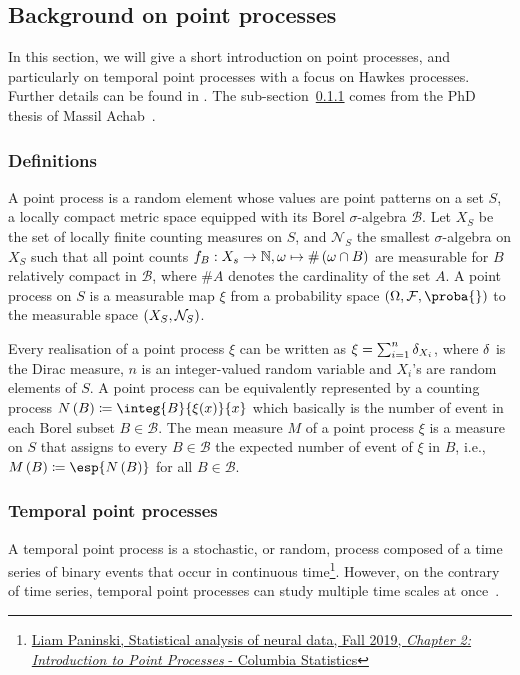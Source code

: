 \subsection{Background on point processes}\label{background_tpp}

In this section, we will give a short introduction on point processes, and particularly on temporal point processes with a focus on Hawkes processes.
Further details can be found in \citep{daley2003introduction, daley2007introduction}.
The sub-section~\ref{pp_definitions} comes from the PhD thesis of Massil Achab~\citep{achab2017learning}.

\subsubsection{Definitions}\label{pp_definitions}
A point process is a random element whose values are point patterns on a set $S$, a locally compact metric space equipped with its Borel $\sigma$-algebra $\mathscr{B}$.
Let $X_S$ be the set of locally finite counting measures on $S$, and $\mathcal{N}_S$ the smallest $\sigma$-algebra on $X_S$ such that all point counts ${f_B: X_s \to \mathbb{N}, \omega \mapsto \#\left( \omega \cap B \right)}$ are measurable for $B$ relatively compact in $\mathscr{B}$, where $\# A$ denotes the cardinality of the set $A$.
A point process on $S$ is a measurable map $\xi$ from a probability space $\pars{\Omega, \mathcal{F}, \proba{}}$ to the measurable space $\left( X_S, \mathcal{N}_S \right)$.

Every realisation of a point process $\xi$ can be written as $\xi = \sum_{i=1}^n \mathrm{\delta}_{X_i}$, where $\mathrm{\delta}$ is the Dirac measure, $n$ is an integer-valued random variable and $X_i$'s are random elements of $S$.
A point process can be equivalently represented by a counting process $N\pars{B} \coloneqq \integ{B}{\xi (x)}{x}$ which basically is the number of event in each Borel subset $B\in\mathscr{B}$.
The mean measure $M$ of a point process $\xi$ is a measure on $S$ that assigns to every $B\in\mathscr{B}$ the expected number of event of $\xi$ in $B$, i.e., $M\pars{B} \coloneqq \esp{N\pars{B}}$ for all $B\in\mathscr{B}$.


\subsubsection{Temporal point processes}
A temporal point process is a stochastic, or random, process composed of a time series of binary events that occur in continuous time\footnote{\href{http://www.stat.columbia.edu/~liam/teaching/neurostat-fall19/uri-eden-point-process-notes.pdf}{Liam Paninski, Statistical analysis of neural data, Fall 2019, \textit{Chapter 2: Introduction to Point Processes} - Columbia Statistics}}.
However, on the contrary of time series, temporal point processes can study multiple time scales at once~\citep{bompaire2019machine}. 

